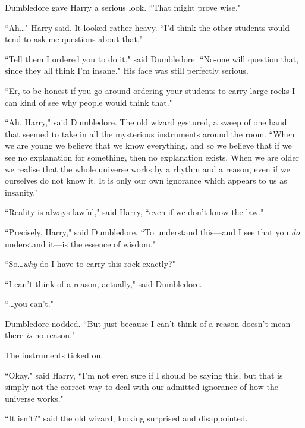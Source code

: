 Dumbledore gave Harry a serious look. ``That might prove wise."

``Ah…" Harry said. It looked rather heavy. ``I'd think the other students would tend to ask me questions about that."

``Tell them I ordered you to do it," said Dumbledore. ``No-one will question that, since they all think I'm insane." His face was still perfectly serious.

``Er, to be honest if you go around ordering your students to carry large rocks I can kind of see why people would think that."

``Ah, Harry," said Dumbledore. The old wizard gestured, a sweep of one hand that seemed to take in all the mysterious instruments around the room. ``When we are young we believe that we know everything, and so we believe that if we see no explanation for something, then no explanation exists. When we are older we realise that the whole universe works by a rhythm and a reason, even if we ourselves do not know it. It is only our own ignorance which appears to us as insanity."

``Reality is always lawful," said Harry, ``even if we don't know the law."

``Precisely, Harry," said Dumbledore. ``To understand this—and I see that you \emph{do} understand it—is the essence of wisdom."

``So…\emph{why} do I have to carry this rock exactly?"

``I can't think of a reason, actually," said Dumbledore.

``…you can't."

Dumbledore nodded. ``But just because I can't think of a reason doesn't mean there \emph{is} no reason."

The instruments ticked on.

``Okay," said Harry, ``I'm not even sure if I should be saying this, but that is simply not the correct way to deal with our admitted ignorance of how the universe works."

``It isn't?" said the old wizard, looking surprised and disappointed.

